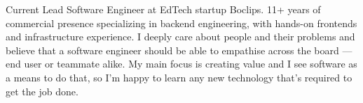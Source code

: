 

\begin{cvparagraph}

Current Lead Software Engineer at EdTech startup Boclips.
11+ years of commercial presence specializing in backend engineering, with hands-on frontends and infrastructure experience.
I deeply care about people and their problems and believe that a software engineer should be able to empathise across the board — end user or teammate alike.
My main focus is creating value and I see software as a means to do that, so I'm happy to learn any new technology that's required to get the job done.
\end{cvparagraph}
